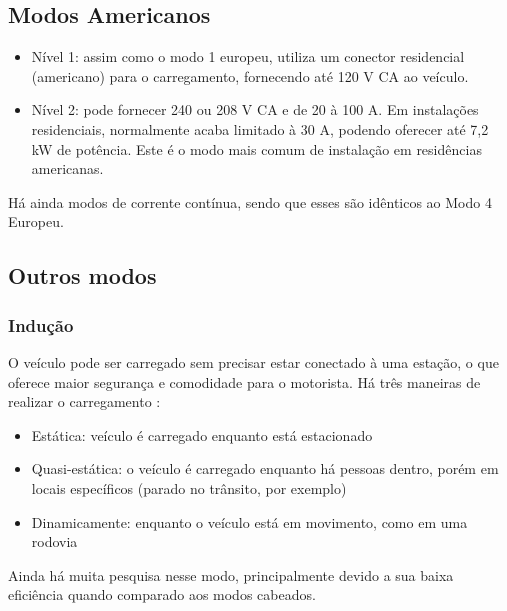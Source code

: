     \subsection{Modos Americanos}
    \label{stateofart:modes:us}

      \begin{itemize}
        \item Nível 1: assim como o modo 1 europeu, utiliza um conector residencial (americano) para o carregamento, fornecendo até 120 V \ac{CA} ao veículo.
        \item Nível 2: pode fornecer 240 ou 208 V \ac{CA} e de 20 à 100 A. Em instalações residenciais, normalmente acaba limitado à 30 A, podendo oferecer até 7,2 kW de potência. Este é o modo mais comum de instalação em residências americanas.
      \end{itemize}

      Há ainda modos de corrente contínua, sendo que esses são idênticos ao Modo 4 Europeu.

    \subsection{Outros modos}
    \label{stateofart:modes:other}

      \subsubsection{Indução}
      \label{stateofart:modes:other:induction}

        O veículo pode ser carregado sem precisar estar conectado à uma estação, o que oferece maior segurança e comodidade para o motorista. Há três maneiras de realizar o carregamento \cite{ieee-review-evse}:

        \begin{itemize}
          \item Estática: veículo é carregado enquanto está estacionado
          \item Quasi-estática: o veículo é carregado enquanto há pessoas dentro, porém em locais específicos (parado no trânsito, por exemplo)
          \item Dinamicamente: enquanto o veículo está em movimento, como em uma rodovia
        \end{itemize}

        Ainda há muita pesquisa nesse modo, principalmente devido a sua baixa eficiência quando comparado aos modos cabeados.

